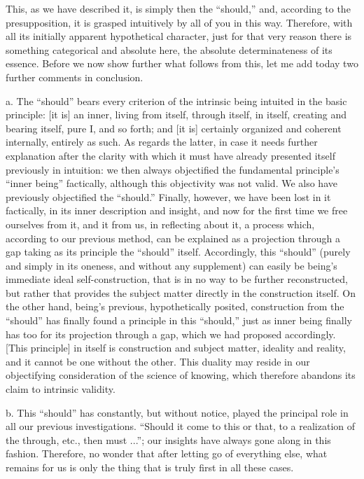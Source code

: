 This, as we have described it,
is simply then the “should,”
and, according to the presupposition,
it is grasped intuitively by all of you in this way.
Therefore, with all its initially apparent hypothetical character,
just for that very reason there is something
categorical and absolute here,
the absolute determinateness of its essence.
Before we now show further what follows from this,
let me add today two further comments in conclusion.

a. The “should” bears every criterion of
the intrinsic being intuited in the basic principle:
[it is] an inner, living from itself, through itself, in itself,
creating and bearing itself, pure I, and so forth;
and [it is] certainly organized and
coherent internally, entirely as such.
As regards the latter, in case it needs further explanation
after the clarity with which it must have
already presented itself previously in intuition:
we then always objectified the fundamental principle's
“inner being” factically,
although this objectivity was not valid.
We also have previously objectified the “should.”
Finally, however, we have been lost in it factically,
in its inner description and insight,
and now for the first time
we free ourselves from it,
and it from us, in reflecting about it,
a process which, according to our previous method,
can be explained as a projection through a gap
taking as its principle the “should” itself.
Accordingly, this “should”
(purely and simply in its oneness,
and without any supplement)
can easily be being's immediate ideal self-construction,
that is in no way to be further reconstructed,
but rather that provides the subject matter
directly in the construction itself.
On the other hand, being's previous,
hypothetically posited,
construction from the “should” has
finally found a principle in this “should,”
just as inner being finally has too
for its projection through a gap,
which we had proposed accordingly.
[This principle] in itself is
construction and subject matter,
ideality and reality,
and it cannot be one without the other.
This duality may reside in our objectifying
consideration of the science of knowing,
which therefore abandons its claim to
intrinsic validity.

b. This “should” has constantly, but without notice,
played the principal role in all our previous investigations.
“Should it come to this or that,
to a realization of the through, etc., then must ...”;
our insights have always gone along in this fashion.
Therefore, no wonder that after
letting go of everything else,
what remains for us is only the thing
that is truly first in all these cases.

